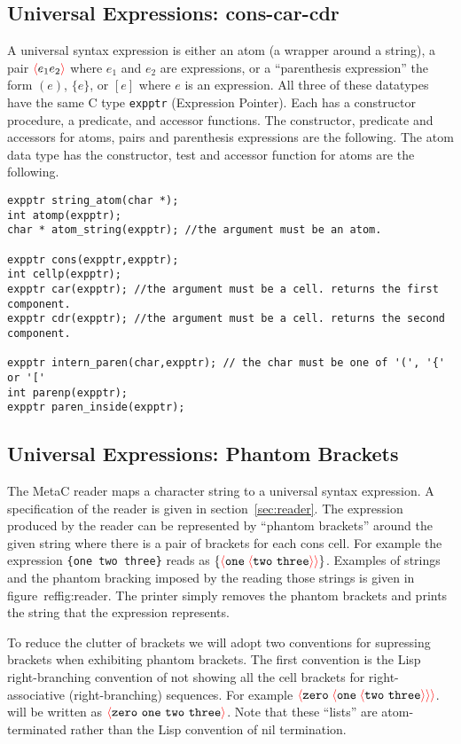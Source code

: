 \documentclass{article}
\newcommand{\mtt}[1]{\mbox{\tt #1}}
\newcommand{\fopen}{{\color{red} \langle}}
\newcommand{\fclose}{{\color{red} \rangle}}
\begin{document}
\subsection{Universal Expressions: cons-car-cdr}

A universal syntax expression is either an atom (a wrapper around a string),
a pair $\fopen e_1 e_2 \fclose$ where $e_1$ and $e_2$ are expressions, or a ``parenthesis expression'' the form $(e)$,
$\{ e\}$, or $[e]$ where $e$ is an expression.   All three of these datatypes have the same C type {\tt expptr} (Expression Pointer).
Each has a constructor procedure, a predicate, and accessor functions.  The constructor, predicate and accessors for atoms, pairs and parenthesis expressions
are the following.
The atom data type has the constructor, test and accessor function for atoms are the following.

\begin{verbatim}
expptr string_atom(char *);
int atomp(expptr);
char * atom_string(expptr); //the argument must be an atom.

expptr cons(expptr,expptr);
int cellp(expptr);
expptr car(expptr); //the argument must be a cell. returns the first component.
expptr cdr(expptr); //the argument must be a cell. returns the second component.

expptr intern_paren(char,expptr); // the char must be one of '(', '{' or '['
int parenp(expptr);
expptr paren_inside(expptr);
\end{verbatim}

\subsection{Universal Expressions: Phantom Brackets}

The MetaC reader maps a character string to a universal syntax expression.  A specification of the reader is given in section~\ref{sec:reader}.
The expression produced by the reader
can be represented by ``phantom brackets'' around the given string
where there is a pair of brackets for each cons cell.
For example the expression \mtt{\{one two three\}} reads as $\{\fopen \mathtt{one}\;\fopen \mathtt{two~three}\fclose \fclose\}$.
Examples of strings and the phantom bracking imposed by the reading those strings is given in figure~{ref{fig:reader}}.
The printer simply removes the phantom brackets and prints the string that the expression represents.

To reduce the clutter of brackets we will adopt two conventions for supressing brackets when exhibiting phantom brackets.
The first convention is the Lisp right-branching convention of not showing all the cell brackets for right-associative (right-branching) sequences.
For example $\fopen \mathtt{zero}\;\fopen \mathtt{one}\;\fopen \mathtt{two~three}\fclose \fclose \fclose$.
will be written as $\fopen\mathtt{zero~one~two~three}\fclose$.  Note that these ``lists'' are atom-terminated rather than the Lisp convention of
nil termination.
\end{document}
